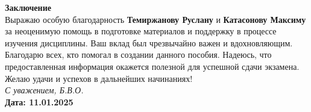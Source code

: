 \documentclass[a4paper,12pt]{article}
\begin{document}
\thispagestyle{empty}
\begin{center}
    \vfill
    \textbf{\Large Заключение} \\
    \vspace{2em}
    Выражаю особую благодарность \textbf{Темиржанову Руслану} и \textbf{Катасонову Максиму} за неоценимую помощь в подготовке материалов и поддержку в процессе изучения дисциплины. Ваш вклад был чрезвычайно важен и вдохновляющим. \\
    \vspace{2em}
    Благодарю всех, кто помогал в создании данного пособия. Надеюсь, что предоставленная информация окажется полезной для успешной сдачи экзамена. \\
    \vspace{2em}
    Желаю удачи и успехов в дальнейших начинаниях! \\
    \vfill
    \textit{С уважением, Б.В.О.} \\
    \vspace{2em}
    \textbf{Дата: 11.01.2025}
    \vspace{3em}
\end{center}
\end{document}
